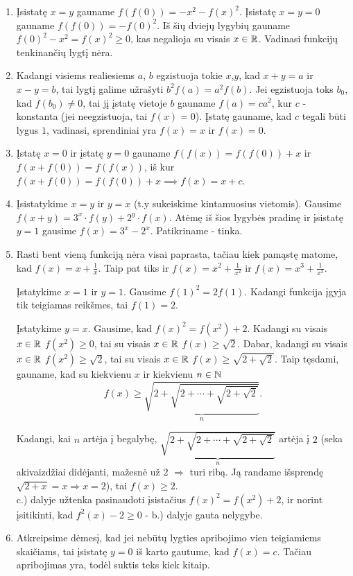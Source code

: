 \begin{enumerate}
\item 
Įsistatę $x=y$ gauname $f(f(0)) = -x^2 - f(x)^2$. Įsistatę $x=y=0$
gauname $f(f(0)) = -f(0)^2$. Iš šių dviejų lygybių gauname $f(0)^2 -
x^2 = f(x)^2 \geq 0$, kas negalioja su visais $x \in \mathbb R$. Vadinasi
funkcijų tenkinančių lygtį nėra.
\item 
Kadangi visiems realiesiems $a$, $b$ egzistuoja tokie $x$,$y$, kad
$x+y=a$ ir $x-y=b$, tai lygtį galime užrašyti $b^2f(a)=a^2f(b)$. Jei
egzistuoja toks $b_0$, kad $f(b_0) \neq 0$, tai jį įstatę vietoje $b$
gauname $f(a)=ca^2$, kur $c$ - konstanta (jei neegzistuoja, tai
$f(x)=0$). Įstatę gauname, kad $c$ tegali būti lygus $1$, vadinasi,
sprendiniai yra $f(x)=x$ ir $f(x)=0$.
\item 
Įstatę $x=0$ ir įstatę $y=0$ gauname $f(f(x))=f(f(0)) +x$ ir
$f(x+f(0))=f(f(x))$, iš kur $f(x+f(0))=f(f(0))+x\implies
f(x)=x+c$.
\item 
Įsistatykime $x=y$ ir $y=x$ (t.y sukeiskime kintamuosius vietomis).
Gausime $f(x+y)=3^x\cdot f(y)+2^y\cdot f(x)$. Atėmę iš šios lygybės
pradinę ir įsistatę $y=1$ gausime $f(x) = 3^x-2^x$. Patikriname -
tinka.
\item 
Rasti bent vieną funkciją nėra visai paprasta, tačiau kiek pamąstę
matome, kad $f(x)=x+\frac{1}{x}$. Taip pat tiks ir
$f(x)=x^2+\frac{1}{x^2}$ ir $f(x)=x^3+\frac{1}{x^3}$.

Įstatykime $x=1$ ir $y=1$. Gausime $f(1)^2=2f(1)$. Kadangi funkcija
įgyja tik teigiamas reikšmes, tai $f(1)=2$.

Įstatykime $y=x$. Gausime, kad $f(x)^2 = f(x^2) + 2$. Kadangi su
visais $x\in \mathbb R$ $f(x^2)\geq 0$, tai su visais $x \in \mathbb R$ $f(x)\geq
\sqrt{2}$. Dabar, kadangi su visais $x\in \mathbb R$ $f(x^2)\geq \sqrt{2}$,
tai su visais $x \in \mathbb R$ $f(x)\geq \sqrt{2+\sqrt{2}}$. Taip tęsdami,
gauname, kad su kiekvienu $x$ ir kiekvienu $n\in \mathbb N$ $$f(x)\geq
\underbrace{\sqrt{2+\sqrt{2+\cdots +\sqrt{2+\sqrt{2}}}}}_{n}.$$

Kadangi, kai $n$ artėja į begalybę, $\underbrace{\sqrt{2+\sqrt{2+\cdots
+\sqrt{2+\sqrt{2}}}}}_{n}$ artėja į $2$ (seka akivaizdžiai didėjanti,
mažesnė už $2$ $\Rightarrow$ turi ribą. Ją randame išsprendę
$\sqrt{2+x}=x \Rightarrow x=2$), tai $f(x) \geq 2$.  \\
c.) dalyje užtenka pasinaudoti įsistačius $f(x)^2 = f(x^2) + 2$,
ir norint įsitikinti, kad $f^2(x)-2\geq 0$ - b.) dalyje gauta nelygybe.
\item 
Atkreipsime dėmesį, kad jei nebūtų lygties apribojimo vien teigiamiems
skaičiams, tai įsistatę $y = 0$ iš karto gautume, kad $f(x)=c$. Tačiau
apribojimas yra, todėl suktis teks kiek kitaip.


\end{enumerate}
